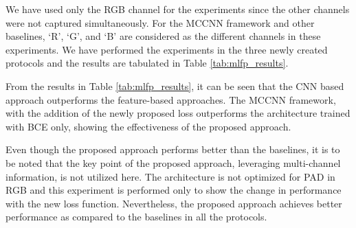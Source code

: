 \documentclass[journal]{IEEEtran}
\begin{document}
We have used only the RGB channel for the experiments since the other channels were not captured simultaneously. For the MCCNN framework and other baselines, `R', `G', and `B' are considered as the different channels in these experiments.
We have performed the experiments in the three newly created protocols and the results are tabulated in Table \ref{tab:mlfp_results}.

From the results in Table \ref{tab:mlfp_results}, it can be seen that the CNN based approach outperforms the feature-based approaches. The MCCNN framework, with the
addition of the newly proposed loss outperforms the architecture trained with BCE only, showing the effectiveness of the proposed approach.

Even though the proposed approach performs better than the baselines, it is to be noted that the key point of the proposed approach, leveraging multi-channel information, is not utilized here. The architecture is not optimized for PAD in RGB and this experiment is performed only to show the change in performance with the new loss function. Nevertheless, the proposed approach achieves better performance as compared to the baselines in all the protocols.


\begin{table}[h]
\centering
\caption{Performance of the proposed framework in the protocols in \textit{MLFP} dataset. Only RGB channel was used in this experiments. The values reported are the EER in the \textit{evaluation} set.}
\label{tab:mlfp_results}
\end{table}
\end{document}
